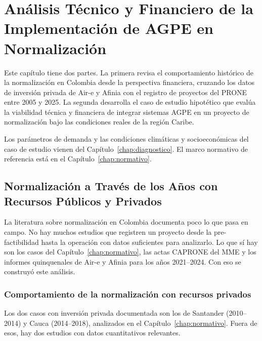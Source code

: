 
\chapter{Análisis Técnico y Financiero de la Implementación de AGPE en Normalización}
\label{chap:tecnico}

Este capítulo tiene dos partes. La primera revisa el comportamiento
histórico de la normalización en Colombia desde la perspectiva
financiera, cruzando los datos de inversión privada de Air-e y Afinia
con el registro de proyectos del PRONE entre 2005 y 2025. La segunda
desarrolla el caso de estudio hipotético que evalúa la viabilidad
técnica y financiera de integrar sistemas AGPE en un proyecto de
normalización bajo las condiciones reales de la región Caribe.

Los parámetros de demanda y las condiciones climáticas y
socioeconómicas del caso de estudio vienen del
Capítulo~\ref{chap:diagnostico}. El marco normativo de referencia
está en el Capítulo~\ref{chap:normativo}.


\section{Normalización a Través de los Años con Recursos Públicos y Privados}
\label{sec:historico}

La literatura sobre normalización en Colombia documenta poco lo que
pasa en campo. No hay muchos estudios que registren un proyecto desde
la pre-factibilidad hasta la operación con datos suficientes para
analizarlo. Lo que sí hay son los casos del Capítulo~\ref{chap:normativo},
las actas CAPRONE del MME y los informes quinquenales de Air-e y Afinia
para los años 2021--2024. Con eso se construyó este análisis.

\subsection{Comportamiento de la normalización con recursos privados}
\label{subsec:rec_privados}

Los dos casos con inversión privada documentada son los de Santander
(2010--2014) y Cauca (2014--2018), analizados en el
Capítulo~\ref{chap:normativo}. Fuera de esos, hay dos estudios con
datos cuantitativos relevantes.

